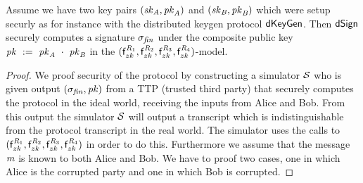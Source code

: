 \begin{theorem}\label{lem:sig:security}
Assume we have two key pairs $(\mathit{sk}_{\mathit{A}}, \mathit{pk}_{\mathit{A}})$ and $(\mathit{sk}_{\mathit{B}}, \mathit{pk}_{\mathit{B}})$ which were setup securly as for instance with the distributed keygen protocol $\mathsf{dKeyGen}$.
    Then $\mathsf{dSign}$ securely computes a signature $\sigma_{\mathit{fin}}$ under the composite public key $\mathit{pk} ~:=~ \mathit{pk}_{\mathit{A}} ~\cdot~ \mathit{pk}_{\mathit{B}}$ in the $(\mathsf{f}^{\mathit{R}_1}_{zk}, \mathsf{f}^{\mathit{R}_2}_{zk}, \mathsf{f}^{\mathit{R}_3}_{zk}, \mathsf{f}^{\mathit{R}_4}_{zk})$-model.
\end{theorem}

\begin{proof}
    We proof security of the protocol by constructing a simulator $\mathcal{S}$ who is given output $(\sigma_{\mathit{fin}}, \mathit{pk})$ from a TTP (trusted third party) that securely computes the protocol in the ideal world, receiving the inputs from Alice and Bob.
    From this output the simulator $\mathcal{S}$ will output a transcript which is indistinguishable from the protocol transcript in the real world.
    The simulator uses the calls to $(\mathsf{f}^{\mathit{R}_1}_{zk}, \mathsf{f}^{\mathit{R}_2}_{zk}, \mathsf{f}^{\mathit{R}_3}_{zk}, \mathsf{f}^{\mathit{R}_4}_{zk})$ in order to do this.
    Furthermore we assume that the message $\mathit{m}$ is known to both Alice and Bob.
    We have to proof two cases, one in which Alice is the corrupted party and one in which Bob is corrupted.
    

\end{proof}
